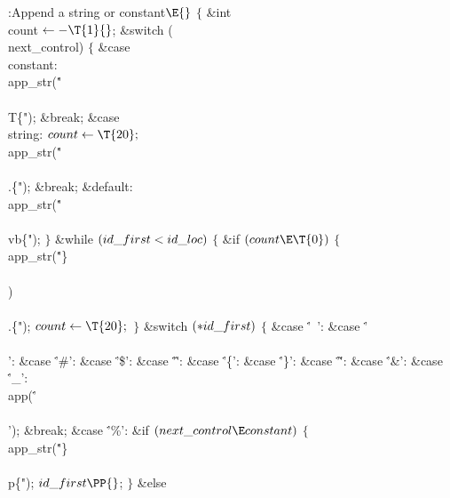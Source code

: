 \Y\B\4:Append a string or constant\X${}\E{}$\6
${}\{{}$\5
\1\&{int} \\{count}${}\K{-}\T{1}{}$;\7
\&{switch} (\\{next\_control})\5
${}\{{}$\1\6
\4\&{case} \\{constant}:\5
\\{app\_str}(\.{"\\\\T\{"});\6
\&{break};\6
\4\&{case} \\{string}:\5
${}\\{count}\K\T{20};{}$\6
\\{app\_str}(\.{"\\\\.\{"});\6
\&{break};\6
\4\&{default}:\5
\\{app\_str}(\.{"\\\\vb\{"});\6
\4${}\}{}$\2\6
\&{while} ${}(\\{id\_first}<\\{id\_loc}){}$\5
${}\{{}$\1\6
\&{if} ${}(\\{count}\E\T{0}){}$\5
${}\{{}$\1\6
\\{app\_str}(\.{"\}\\\\)\\\\.\{"});\6
${}\\{count}\K\T{20};{}$\6
\4${}\}{}$\2\6
\&{switch} ${}({*}\\{id\_first}){}$\5
${}\{{}$\1\6
\4\&{case} \.{'\ '}:\5
\&{case} \.{'\\\\'}:\5
\&{case} \.{'\#'}:\5
\&{case} \.{'\$'}:\5
\&{case} \.{'\^'}:\5
\&{case} \.{'\{'}:\5
\&{case} \.{'\}'}:\5
\&{case} \.{'\~'}:\5
\&{case} \.{'\&'}:\5
\&{case} \.{'\_'}:\5
\\{app}(\.{'\\\\'});\6
\&{break};\6
\4\&{case} \.{'\%'}:\6
\&{if} ${}(\\{next\_control}\E\\{constant}){}$\5
${}\{{}$\1\6
\\{app\_str}(\.{"\}\\\\p\{"});\6
${}\\{id\_first}\PP{}$;\6
\4${}\}{}$\2\6
\&{else}\1\5
